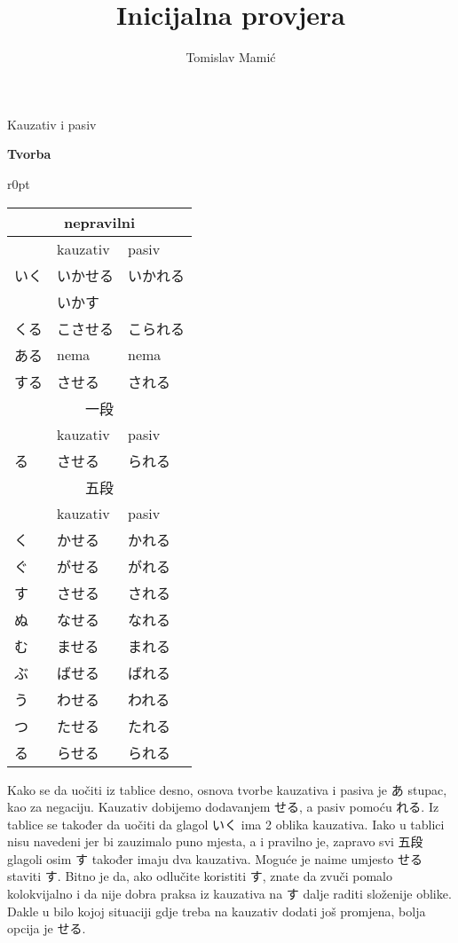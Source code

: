 \documentclass[12pt]{article}
\author{Tomislav Mamić}
\title{Inicijalna provjera}
\begin{document}
	\large Kauzativ i pasiv
	
	\vspace{20pt}
	\normalsize \textbf{Tvorba}
	\vspace{20pt}

\begin{wraptable}[22]{r}{0pt}
	\begin{tabular}{|l|l|l|}
		\hline
		\multicolumn{3}{|c|}{nepravilni}\\
		\hline
		&kauzativ&pasiv\\
		\hline
		いく&いかせる&いかれる\\
		&いかす&\\
		くる&こさせる&こられる\\
		ある&nema\footnotemark[1]&nema\footnotemark[1]\\
		する&させる&される\\
		\hline
		\hline
		\multicolumn{3}{|c|}{一段}\\
		\hline
		&kauzativ&pasiv\\
		\hline
		る&させる&られる\footnotemark[2]\\
		\hline
		\hline
		\multicolumn{3}{|c|}{五段}\\
		\hline
		&kauzativ&pasiv\\
		\hline
		く&かせる&かれる\\
		ぐ&がせる&がれる\\
		す&させる&される\\
		\hline
		ぬ&なせる&なれる\\
		む&ませる&まれる\\
		ぶ&ばせる&ばれる\\
		\hline
		う&わせる&われる\\
		つ&たせる&たれる\\
		る&らせる&られる\\
		\hline
	\end{tabular}
\end{wraptable}

	Kako se da uočiti iz tablice desno, osnova tvorbe kauzativa i pasiva je あ stupac, kao za negaciju. Kauzativ dobijemo dodavanjem せる, a pasiv pomoću れる. Iz tablice se također da uočiti da glagol いく ima 2 oblika kauzativa. Iako u tablici nisu navedeni jer bi zauzimalo puno mjesta, a i pravilno je, zapravo svi 五段 glagoli osim す također imaju dva kauzativa. Moguće je naime umjesto せる staviti す. Bitno je da, ako odlučite koristiti す, znate da zvuči pomalo kolokvijalno i da nije dobra praksa iz kauzativa na す dalje raditi složenije oblike. Dakle u bilo kojoj situaciji gdje treba na kauzativ dodati još promjena, bolja opcija je せる.
	
\end{document}
